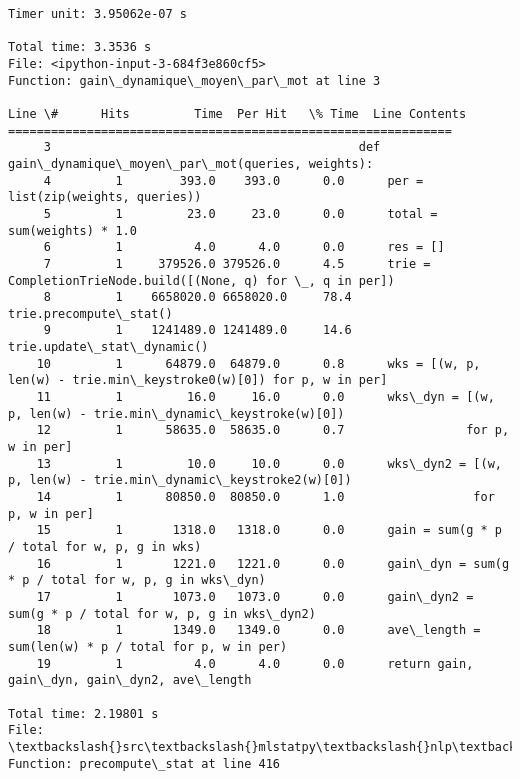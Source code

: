 \documentclass[11pt]{article}
\begin{document}
    \begin{Verbatim}[commandchars=\\\{\}]
Timer unit: 3.95062e-07 s

Total time: 3.3536 s
File: <ipython-input-3-684f3e860cf5>
Function: gain\_dynamique\_moyen\_par\_mot at line 3

Line \#      Hits         Time  Per Hit   \% Time  Line Contents
==============================================================
     3                                           def gain\_dynamique\_moyen\_par\_mot(queries, weights):
     4         1        393.0    393.0      0.0      per = list(zip(weights, queries))
     5         1         23.0     23.0      0.0      total = sum(weights) * 1.0
     6         1          4.0      4.0      0.0      res = []
     7         1     379526.0 379526.0      4.5      trie = CompletionTrieNode.build([(None, q) for \_, q in per])
     8         1    6658020.0 6658020.0     78.4      trie.precompute\_stat()
     9         1    1241489.0 1241489.0     14.6      trie.update\_stat\_dynamic()
    10         1      64879.0  64879.0      0.8      wks = [(w, p, len(w) - trie.min\_keystroke0(w)[0]) for p, w in per]
    11         1         16.0     16.0      0.0      wks\_dyn = [(w, p, len(w) - trie.min\_dynamic\_keystroke(w)[0])
    12         1      58635.0  58635.0      0.7                 for p, w in per]
    13         1         10.0     10.0      0.0      wks\_dyn2 = [(w, p, len(w) - trie.min\_dynamic\_keystroke2(w)[0])
    14         1      80850.0  80850.0      1.0                  for p, w in per]
    15         1       1318.0   1318.0      0.0      gain = sum(g * p / total for w, p, g in wks)
    16         1       1221.0   1221.0      0.0      gain\_dyn = sum(g * p / total for w, p, g in wks\_dyn)
    17         1       1073.0   1073.0      0.0      gain\_dyn2 = sum(g * p / total for w, p, g in wks\_dyn2)
    18         1       1349.0   1349.0      0.0      ave\_length = sum(len(w) * p / total for p, w in per)
    19         1          4.0      4.0      0.0      return gain, gain\_dyn, gain\_dyn2, ave\_length

Total time: 2.19801 s
File: \textbackslash{}src\textbackslash{}mlstatpy\textbackslash{}nlp\textbackslash{}completion.py
Function: precompute\_stat at line 416


\end{Verbatim}
\end{document}
